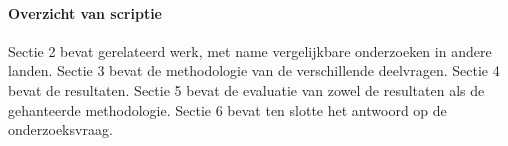 \paragraph{Overzicht van scriptie}
Sectie 2 bevat gerelateerd werk, met name vergelijkbare onderzoeken in andere landen. Sectie 3 bevat de methodologie van de verschillende deelvragen. Sectie 4 bevat de resultaten. Sectie 5 bevat de evaluatie van zowel de resultaten als de gehanteerde methodologie. Sectie 6 bevat ten slotte het antwoord op de onderzoeksvraag.
